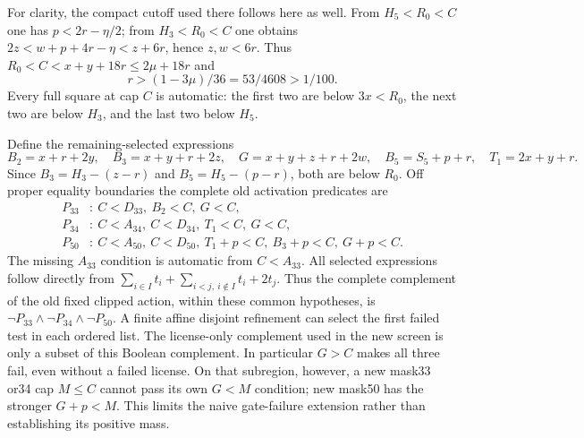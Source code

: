 For clarity, the compact cutoff used there follows here as well.
From $H_5<R_0<C$ one has $p<2r-\eta/2$; from $H_3<R_0<C$ one obtains
$2z<w+p+4r-\eta<z+6r$, hence $z,w<6r$. Thus
$R_0<C<x+y+18r\le2\mu+18r$ and
\begin{equation}\label{eq:lowercomp-cutoff}
 r>(1-3\mu)/36=53/4608>1/100.
\end{equation}
Every full square at cap $C$ is automatic: the first two are below
$3x<R_0$, the next two are below $H_3$, and the last two below $H_5$.

Define the remaining-selected expressions
\[
 B_2=x+r+2y,\quad B_3=x+y+r+2z,\quad
 G=x+y+z+r+2w,\quad B_5=S_5+p+r,\quad T_1=2x+y+r.
\]
Since $B_3=H_3-(z-r)$ and $B_5=H_5-(p-r)$, both are below $R_0$.
Off proper equality boundaries the complete old activation predicates are
\begin{align}
 P_{33}&:\ C<D_{33},\ B_2<C,\ G<C,\label{eq:lowercomp-p33}\\
 P_{34}&:\ C<A_{34},\ C<D_{34},\ T_1<C,\ G<C,\label{eq:lowercomp-p34}\\
 P_{50}&:\ C<A_{50},\ C<D_{50},\ T_1+p<C,\ B_3+p<C,\ G+p<C.
 \label{eq:lowercomp-p50}
\end{align}
The missing $A_{33}$ condition is automatic from $C<A_{33}$.
All selected expressions follow directly from
$\sum_{i\in I}t_i+\sum_{i<j,\ i\notin I}t_i+2t_j$.
Thus the complete complement of the old fixed clipped action, within these
common hypotheses, is $\neg P_{33}\wedge\neg P_{34}\wedge\neg P_{50}$.
A finite affine disjoint refinement can select the first failed test in
each ordered list. The license-only complement used in the new screen is
only a subset of this Boolean complement. In particular $G>C$ makes all
three fail, even without a failed license. On that subregion, however,
a new mask33 or34 cap $M\le C$ cannot pass its own $G<M$ condition;
new mask50 has the stronger $G+p<M$. This limits the naive gate-failure
extension rather than establishing its positive mass.

